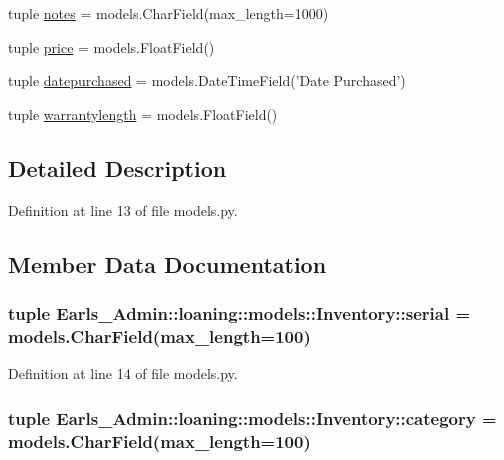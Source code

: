 \begin{CompactItemize}
tuple \hyperlink{classEarls__Admin_1_1loaning_1_1models_1_1Inventory_84dc6e3885385f9a8e756bff4ede9f3a}{notes} = models.CharField(max\_\-length=1000)
\item 
tuple \hyperlink{classEarls__Admin_1_1loaning_1_1models_1_1Inventory_fbe852b7b819ae0ce974d23cd2114a50}{price} = models.FloatField()
\item 
tuple \hyperlink{classEarls__Admin_1_1loaning_1_1models_1_1Inventory_e493e8119541f509f4d0c901619ac228}{datepurchased} = models.DateTimeField('Date Purchased')
\item 
tuple \hyperlink{classEarls__Admin_1_1loaning_1_1models_1_1Inventory_f013c3e241c3c2fa87307d61aebd39de}{warrantylength} = models.FloatField()
\end{CompactItemize}


\subsection{Detailed Description}


Definition at line 13 of file models.py.

\subsection{Member Data Documentation}
\hypertarget{classEarls__Admin_1_1loaning_1_1models_1_1Inventory_e61a757662fa746bbf01bc25e0eec5bc}{
\subsubsection[serial]{\setlength{\rightskip}{0pt plus 5cm}tuple {\bf Earls\_\-Admin::loaning::models::Inventory::serial} = models.CharField(max\_\-length=100)}}
\label{classEarls__Admin_1_1loaning_1_1models_1_1Inventory_e61a757662fa746bbf01bc25e0eec5bc}




Definition at line 14 of file models.py.\hypertarget{classEarls__Admin_1_1loaning_1_1models_1_1Inventory_a082b0a75479ea2ad2c8b785236e2db4}{
\subsubsection[category]{\setlength{\rightskip}{0pt plus 5cm}tuple {\bf Earls\_\-Admin::loaning::models::Inventory::category} = models.CharField(max\_\-length=100)}}
\label{classEarls__Admin_1_1loaning_1_1models_1_1Inventory_a082b0a75479ea2ad2c8b785236e2db4}




